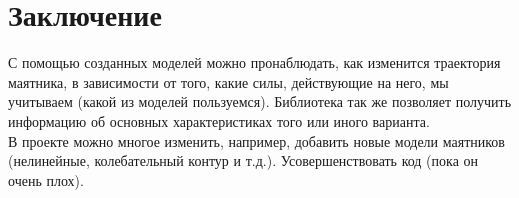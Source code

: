 \section*{Заключение}
С помощью созданных моделей можно пронаблюдать, как изменится траектория маятника, в зависимости от того, какие силы, действующие на него, мы учитываем (какой из моделей пользуемся). Библиотека так же позволяет получить информацию об основных характеристиках того или иного варианта. \\
В проекте можно многое изменить, например, добавить новые модели маятников (нелинейные, колебательный контур и т.д.). Усовершенствовать код (пока он очень плох).
